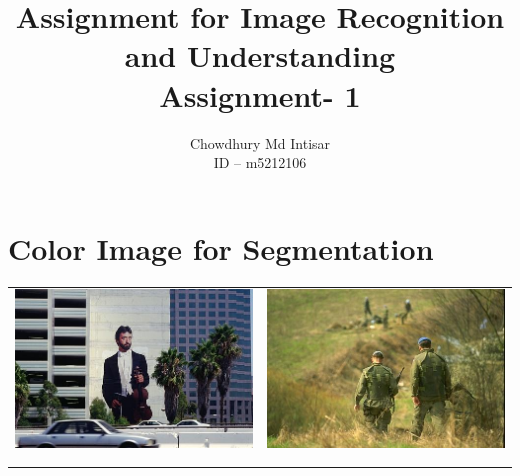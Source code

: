 \documentclass{article}
\title{Assignment  for    Image  Recognition  and  Understanding\\
Assignment- 1}
\author{Chowdhury Md Intisar\\
ID -- m5212106
}
\begin{document}
\maketitle
\section{Color Image for Segmentation}


\begin{center}
\begin{table}
\begin{tabular}{c| c}
\includegraphics[scale = 0.3]{image1} & \includegraphics[scale = 0.3]{image2}\\
\\\hline\\

\end{tabular}
\end{table}
\end{center}
\end{document}
